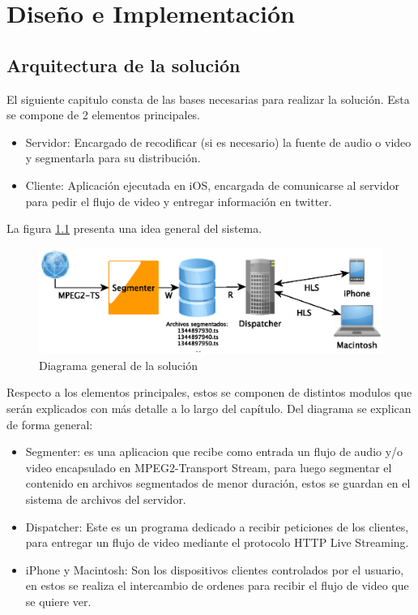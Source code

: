 \chapter{Diseño e Implementación}
\section{Arquitectura de la solución}
El siguiente capitulo consta de las bases necesarias para realizar la solución. Esta se compone de 2 elementos principales. 
\begin{itemize}
\item Servidor: Encargado de recodificar (si es necesario) la fuente de audio o video y segmentarla para su distribución.
\item Cliente: Aplicación ejecutada en iOS, encargada de comunicarse al servidor para pedir el flujo de video y entregar información en twitter.
\end{itemize}
La figura \ref{diagramaGral} presenta una idea general del sistema.\\

\begin{figure}[H]
	\centering
	\includegraphics[scale=0.8]{imgs/diagrama_general.eps}
	\caption{Diagrama general de la solución}
	\label{diagramaGral}
\end{figure}

Respecto a los elementos principales, estos se componen de distintos modulos que serán explicados con más detalle a lo largo del capítulo. Del diagrama se explican de forma general:
\begin{itemize}
\item Segmenter: es una aplicacion que recibe como entrada un flujo de audio y/o video encapsulado en MPEG2-Transport Stream, para luego segmentar el contenido en archivos segmentados de menor duración, estos se guardan en el sistema de archivos del servidor.
\item Dispatcher: Este es un programa dedicado a recibir peticiones de los clientes, para entregar un flujo de video mediante el protocolo HTTP Live Streaming.
\item iPhone y Macintosh: Son los dispositivos clientes controlados por el usuario, en estos se realiza el intercambio de ordenes para recibir el flujo de video que se quiere ver.
\end{itemize}

